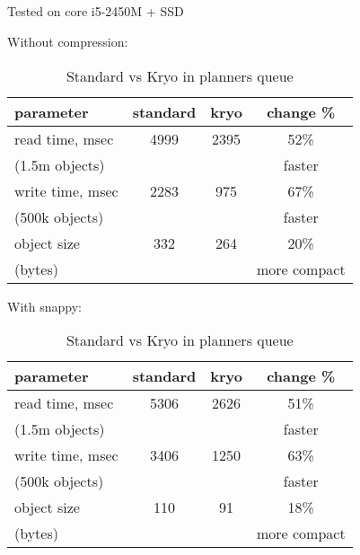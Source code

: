 \documentclass[8pt]{beamer}
\begin{document}
\subsection{\partname}
\begin{frame}[fragile]{\partname}

Tested on core i5-2450M + SSD

Without compression:

  \begin{table}
    \begin{tabular}{l | c | c | c }
      parameter       & standard & kryo & change \% \\
      \hline \hline
      read time, msec & 4999 & 2395   & 52\%   \\
      (1.5m objects)  &      &        & faster \\
      \hline
      write time, msec& 2283 & 975   & 67\%   \\
      (500k objects)  &      &       & faster \\
      \hline
      object size     & 332 & 264   & 20\% \\
      (bytes)         &     &       & more compact \\
      \hline
    \end{tabular}

    \caption{Standard vs Kryo in planners queue}
  \end{table}

With snappy:

  \begin{table}
    \begin{tabular}{l | c | c | c }
      parameter       & standard & kryo & change \% \\
      \hline \hline
      read time, msec       & 5306 & 2626   & 51\%   \\
      (1.5m objects)        &      &        & faster \\
      \hline
      write time, msec      & 3406 & 1250   & 63\%   \\
      (500k objects)        &      &       & faster \\
      \hline
      object size           & 110 & 91   & 18\% \\
      (bytes)               &     &      & more compact \\
      \hline
    \end{tabular}

    \caption{Standard vs Kryo in planners queue}
  \end{table}


 \begin{verbatim}

\end{verbatim}
\end{frame}
\end{document}
